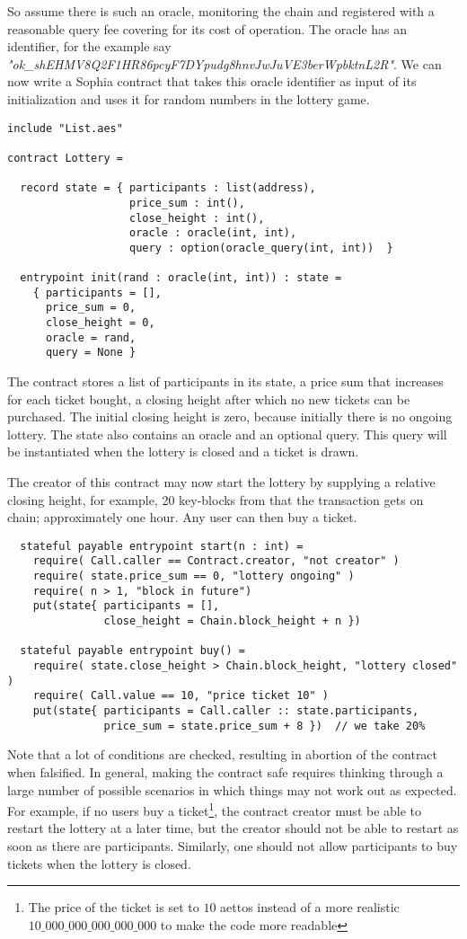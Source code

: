 So assume there is such an oracle, monitoring the chain and registered
with a reasonable query fee covering for its cost of operation. The
oracle has an identifier, for the example say
\textit{"ok\_shEHMV8Q2F1HR86pcyF7DYpudg8hnvJwJuVE3berWpbktnL2R"}.
We can now write a Sophia contract that takes this oracle identifier
as input of its initialization and uses it for random numbers in the
lottery game.

\begin{verbatim}
include "List.aes"

contract Lottery =

  record state = { participants : list(address),
                   price_sum : int(),
                   close_height : int(),
                   oracle : oracle(int, int),
                   query : option(oracle_query(int, int))  }

  entrypoint init(rand : oracle(int, int)) : state =
    { participants = [],
      price_sum = 0,
      close_height = 0,
      oracle = rand,
      query = None }
\end{verbatim}

The contract stores a list of participants in its state, a price sum
that increases for each ticket bought, a closing height after which no
new tickets can be purchased. The initial closing height is zero,
because initially there is no ongoing lottery. The state also contains
an oracle and an optional query. This query will be instantiated when
the lottery is closed and a ticket is drawn.

The creator of this contract may now start the lottery by supplying a relative closing height,
for example, 20 key-blocks from that the transaction gets on chain;
approximately one hour. Any user can then buy a ticket.
\begin{verbatim}
  stateful payable entrypoint start(n : int) =
    require( Call.caller == Contract.creator, "not creator" )
    require( state.price_sum == 0, "lottery ongoing" )
    require( n > 1, "block in future")
    put(state{ participants = [],
               close_height = Chain.block_height + n })

  stateful payable entrypoint buy() =
    require( state.close_height > Chain.block_height, "lottery closed" )
    require( Call.value == 10, "price ticket 10" )
    put(state{ participants = Call.caller :: state.participants,
               price_sum = state.price_sum + 8 })  // we take 20%
\end{verbatim}
Note that a lot of conditions are checked, resulting in abortion of
the contract when falsified. In general, making the contract safe
requires thinking through a large number of possible scenarios in
which things may not work out as expected.
For example, if no users buy a ticket\footnote{The price of the ticket
is set to $10$ aettos instead of a more realistic  $10\_000\_000\_000\_000\_000$ to
make the code more readable}, the contract creator must be
able to restart the lottery at a later time, but the creator should
not be able to restart as soon as there are participants. Similarly,
one should not allow participants to buy tickets when the lottery is
closed.


